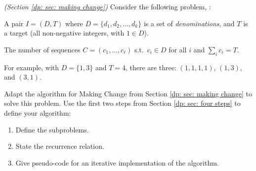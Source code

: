 \documentclass[11pt]{article}
\begin{document}



\newpage

\problem \emph{(Section \ref{dp: sec: making change})}
Consider the following problem, :

\begin{mylist}
\item[\bf input:]
  A pair $I=(D, T)$ where
  $D=\{d_1, d_2, \ldots, d_k\}$
  is a set of \emph{denominations},
  and $T$ is a target
  (all non-negative integers, with $1\in D$).

\item[\bf output:]
  The number of sequences $C=(c_1, \ldots, c_\ell)$
  s.t.~$c_i\in D$ for all $i$
  and $\sum_i c_i = T$.
\end{mylist}

For example, with $D=\{1, 3\}$ and $T=4$, there are three: $(1, 1, 1, 1)$, $(1, 3)$, and $(3, 1)$.

Adapt the algorithm for Making Change from Section \ref{dp: sec: making change} to solve this problem.
Use the first two steps from Section \ref{dp: sec: four steps} to define your algorithm:

\begin{enumerate}[label=(\alph*)]

\item Define the subproblems.

\item State the recurrence relation.

\item Give pseudo-code for an iterative implementation of the algorithm.
  
\end{enumerate}

\continued

\setlength{\ITEMHT}{2in}
{\injectEnumerate
}

\end{document}
